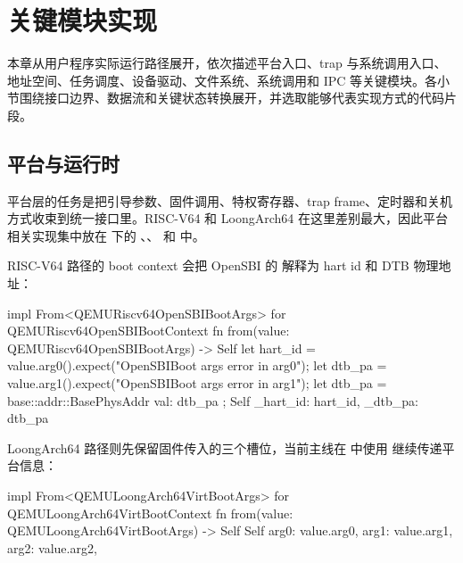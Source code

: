 %
%

\chapter{关键模块实现}

本章从用户程序实际运行路径展开，依次描述平台入口、trap 与系统调用入口、地址空间、任务调度、设备驱动、文件系统、系统调用和 IPC 等关键模块。各小节围绕接口边界、数据流和关键状态转换展开，并选取能够代表实现方式的代码片段。


\section{平台与运行时}

平台层的任务是把引导参数、固件调用、特权寄存器、trap frame、定时器和关机方式收束到统一接口里。RISC-V64 和 LoongArch64 在这里差别最大，因此平台相关实现集中放在  下的 、、 和  中。

RISC-V64 路径的 boot context 会把 OpenSBI 的  解释为 hart id 和 DTB 物理地址：

\begin{rustcode}
impl From<QEMURiscv64OpenSBIBootArgs> for QEMURiscv64OpenSBIBootContext {
    fn from(value: QEMURiscv64OpenSBIBootArgs) -> Self {
        let hart_id = value.arg0().expect("OpenSBIBoot args error in arg0");
        let dtb_pa = value.arg1().expect("OpenSBIBoot args error in arg1");
        let dtb_pa = base::addr::BasePhysAddr { val: dtb_pa };
        Self { _hart_id: hart_id, _dtb_pa: dtb_pa }
    }
}
\end{rustcode}

LoongArch64 路径则先保留固件传入的三个槽位，当前主线在  中使用  继续传递平台信息：

\begin{rustcode}
impl From<QEMULoongArch64VirtBootArgs> for QEMULoongArch64VirtBootContext {
    fn from(value: QEMULoongArch64VirtBootArgs) -> Self {
        Self {
            arg0: value.arg0,
            arg1: value.arg1,
            arg2: value.arg2,
        }
    }
}
\end{rustcode}

